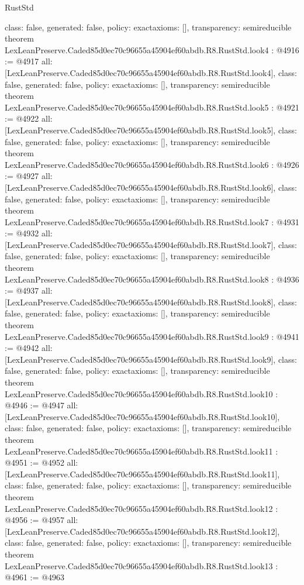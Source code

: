 \begin{lexlean}{RustStd}
\begin{coremodule}
{  class: false,
  generated: false,
  policy: exact{axioms: []},
  transparency: semireducible
}
theorem LexLeanPreserve.Caded85d0ec70c96655a45904ef60abdb.R8.RustStd.look4 : @4916 := @4917 {
  all: [LexLeanPreserve.Caded85d0ec70c96655a45904ef60abdb.R8.RustStd.look4],
  class: false,
  generated: false,
  policy: exact{axioms: []},
  transparency: semireducible
}
theorem LexLeanPreserve.Caded85d0ec70c96655a45904ef60abdb.R8.RustStd.look5 : @4921 := @4922 {
  all: [LexLeanPreserve.Caded85d0ec70c96655a45904ef60abdb.R8.RustStd.look5],
  class: false,
  generated: false,
  policy: exact{axioms: []},
  transparency: semireducible
}
theorem LexLeanPreserve.Caded85d0ec70c96655a45904ef60abdb.R8.RustStd.look6 : @4926 := @4927 {
  all: [LexLeanPreserve.Caded85d0ec70c96655a45904ef60abdb.R8.RustStd.look6],
  class: false,
  generated: false,
  policy: exact{axioms: []},
  transparency: semireducible
}
theorem LexLeanPreserve.Caded85d0ec70c96655a45904ef60abdb.R8.RustStd.look7 : @4931 := @4932 {
  all: [LexLeanPreserve.Caded85d0ec70c96655a45904ef60abdb.R8.RustStd.look7],
  class: false,
  generated: false,
  policy: exact{axioms: []},
  transparency: semireducible
}
theorem LexLeanPreserve.Caded85d0ec70c96655a45904ef60abdb.R8.RustStd.look8 : @4936 := @4937 {
  all: [LexLeanPreserve.Caded85d0ec70c96655a45904ef60abdb.R8.RustStd.look8],
  class: false,
  generated: false,
  policy: exact{axioms: []},
  transparency: semireducible
}
theorem LexLeanPreserve.Caded85d0ec70c96655a45904ef60abdb.R8.RustStd.look9 : @4941 := @4942 {
  all: [LexLeanPreserve.Caded85d0ec70c96655a45904ef60abdb.R8.RustStd.look9],
  class: false,
  generated: false,
  policy: exact{axioms: []},
  transparency: semireducible
}
theorem LexLeanPreserve.Caded85d0ec70c96655a45904ef60abdb.R8.RustStd.look10 : @4946 := @4947 {
  all: [LexLeanPreserve.Caded85d0ec70c96655a45904ef60abdb.R8.RustStd.look10],
  class: false,
  generated: false,
  policy: exact{axioms: []},
  transparency: semireducible
}
theorem LexLeanPreserve.Caded85d0ec70c96655a45904ef60abdb.R8.RustStd.look11 : @4951 := @4952 {
  all: [LexLeanPreserve.Caded85d0ec70c96655a45904ef60abdb.R8.RustStd.look11],
  class: false,
  generated: false,
  policy: exact{axioms: []},
  transparency: semireducible
}
theorem LexLeanPreserve.Caded85d0ec70c96655a45904ef60abdb.R8.RustStd.look12 : @4956 := @4957 {
  all: [LexLeanPreserve.Caded85d0ec70c96655a45904ef60abdb.R8.RustStd.look12],
  class: false,
  generated: false,
  policy: exact{axioms: []},
  transparency: semireducible
}
theorem LexLeanPreserve.Caded85d0ec70c96655a45904ef60abdb.R8.RustStd.look13 : @4961 := @4963 {
}
\end{coremodule}
\end{lexlean}
